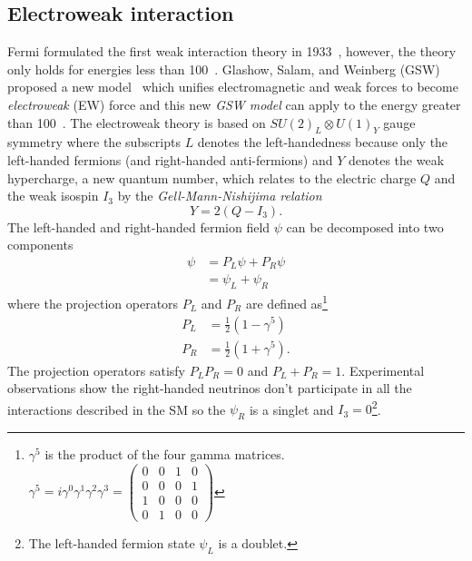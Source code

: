 
\subsection{Electroweak interaction}
\label{subsec:sm_ewk_interaction}
Fermi formulated the first weak interaction theory in 1933~\cite{BF01351864}, however, the theory only holds for energies less than 100~{\GeV}.
Glashow, Salam, and Weinberg (GSW) proposed a new model~\cite{BF02726525,PhysRevLett.19.1264,0029-55826190469-2} which unifies electromagnetic and weak forces to become \textit{electroweak} (EW) force and this new \textit{GSW model} can apply to the energy greater than 100~{\GeV}.
The electroweak theory is based on $SU(2)_{L} \otimes U(1)_{Y}$ gauge symmetry where the subscripts $L$ denotes the left-handedness because only the left-handed fermions (and right-handed anti-fermions) and $Y$ denotes the weak hypercharge, a new quantum number, which relates to the electric charge $Q$ and the weak isospin $I_{3}$ by the \textit{Gell-Mann-Nishijima relation}~\cite{PTP.10.581,BF02748000}
%
\begin{equation}
Y = 2(Q - I_{3}).
\label{eq:sm_hypercharge}
\end{equation}
%
The left-handed and right-handed fermion field $\psi$ can be decomposed into two components
%
\begin{align}
\psi & = P_{L}\psi + P_{R}\psi\\
     & = \psi_{L} + \psi_{R}
\label{eq:sm_fermion_field_components}
\end{align}
%
where the projection operators $P_{L}$ and $P_{R}$ are defined as\footnote{$\gamma^{5}$ is the product of the four gamma matrices. $\gamma^{5} = i \gamma^{0} \gamma^{1} \gamma^{2} \gamma^{3} = \left(\begin{matrix}0 & 0 & 1 & 0\\0 & 0 & 0 & 1\\1 & 0 & 0 & 0\\0 & 1 & 0 & 0\end{matrix}\right)$}
%
\begin{align}
P_{L} & = \frac{1}{2} (1 - \gamma^{5})\\
P_{R} & = \frac{1}{2} (1 + \gamma^{5}).
\label{eq:sm_projection_operators}
\end{align}
%
The projection operators satisfy $P_{L}P_{R} = 0$ and $P_{L} + P_{R} = 1$.
Experimental observations show the right-handed neutrinos don't participate in all the interactions described in the SM so the $\psi_{R}$ is a singlet and $I_{3} = 0$\footnote{The left-handed fermion state $\psi_{L}$ is a doublet.}.
